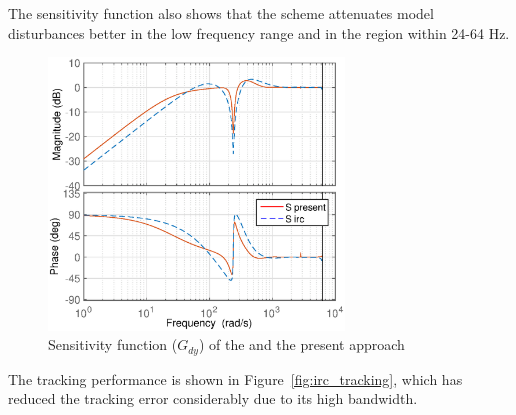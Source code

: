 The \abbrIRC sensitivity function also shows that the \abbrIRC scheme attenuates model disturbances better in the low frequency range and in the region within 24-64 Hz.

\begin{figure}[h!]
  \centering
  \includegraphics[width=0.7\textwidth]{fig/matlab/sensitivity_irc.eps}
  \caption{\label{fig:sensitivity_irc}Sensitivity function ($G_{dy}$) of the \abbrIRC and the present approach}
\end{figure}

\FloatBarrier
The \abbrIRC tracking performance is shown in Figure~\ref{fig:irc_tracking}, which has reduced the tracking error considerably due to its high bandwidth.

